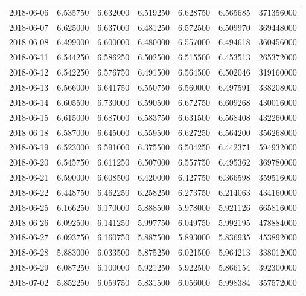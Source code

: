 \begin{tabular}{lrrrrrr}
2018-06-06 &    6.535750 &    6.632000 &    6.519250 &    6.628750 &    6.565685 &   371356000 \\
2018-06-07 &    6.625000 &    6.637000 &    6.481250 &    6.572500 &    6.509970 &   369448000 \\
2018-06-08 &    6.499000 &    6.600000 &    6.480000 &    6.557000 &    6.494618 &   360456000 \\
2018-06-11 &    6.544250 &    6.586250 &    6.502500 &    6.515500 &    6.453513 &   265372000 \\
2018-06-12 &    6.542250 &    6.576750 &    6.491500 &    6.564500 &    6.502046 &   319160000 \\
2018-06-13 &    6.566000 &    6.641750 &    6.550750 &    6.560000 &    6.497591 &   338208000 \\
2018-06-14 &    6.605500 &    6.730000 &    6.590500 &    6.672750 &    6.609268 &   430016000 \\
2018-06-15 &    6.615000 &    6.687000 &    6.583750 &    6.631500 &    6.568408 &   432260000 \\
2018-06-18 &    6.587000 &    6.645000 &    6.559500 &    6.627250 &    6.564200 &   356268000 \\
2018-06-19 &    6.523000 &    6.591000 &    6.375500 &    6.504250 &    6.442371 &   594932000 \\
2018-06-20 &    6.545750 &    6.611250 &    6.507000 &    6.557750 &    6.495362 &   369780000 \\
2018-06-21 &    6.590000 &    6.608500 &    6.420000 &    6.427750 &    6.366598 &   359516000 \\
2018-06-22 &    6.448750 &    6.462250 &    6.258250 &    6.273750 &    6.214063 &   434160000 \\
2018-06-25 &    6.166250 &    6.170000 &    5.888500 &    5.978000 &    5.921126 &   665816000 \\
2018-06-26 &    6.092500 &    6.141250 &    5.997750 &    6.049750 &    5.992195 &   478884000 \\
2018-06-27 &    6.093750 &    6.160750 &    5.887500 &    5.893000 &    5.836935 &   453892000 \\
2018-06-28 &    5.883000 &    6.033500 &    5.875250 &    6.021500 &    5.964213 &   338012000 \\
2018-06-29 &    6.087250 &    6.100000 &    5.921250 &    5.922500 &    5.866154 &   392300000 \\
2018-07-02 &    5.852250 &    6.059750 &    5.831500 &    6.056000 &    5.998384 &   357572000 \\

\end{tabular}
